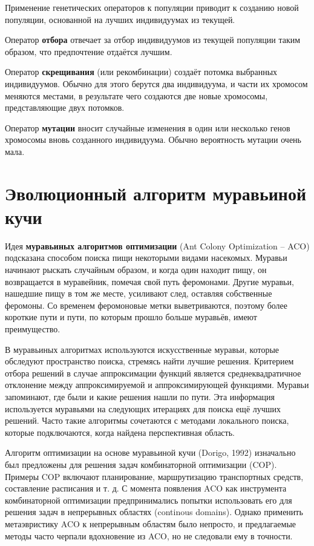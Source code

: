 Применение генетических операторов к популяции приводит к созданию новой популяции, основанной на лучших индивидуумах из текущей.~\cite{book1}

Оператор \textbf{отбора} отвечает за отбор индивидуумов из текущей популяции таким образом, что предпочтение отдаётся лучшим.~\cite{book1}

Оператор \textbf{скрещивания} (или рекомбинации) создаёт потомка выбранных индивидуумов. Обычно для этого берутся два индивидуума, и части их хромосом меняются местами, в результате чего создаются две новые хромосомы, представляющие двух потомков.~\cite{book1}

Оператор \textbf{мутации} вносит случайные изменения в один или несколько генов хромосомы вновь созданного индивидуума. Обычно вероятность мутации очень мала.~\cite{book1}

\section{Эволюционный алгоритм муравьиной кучи}

Идея \textbf{муравьиных алгоритмов оптимизации} (Ant Colony Optimization – ACO) подсказана способом поиска пищи некоторыми видами насекомых. Муравьи начинают рыскать случайным образом, и когда один находит пищу, он возвращается в муравейник, помечая свой путь феромонами. Другие муравьи, нашедшие пищу в том же месте, усиливают след, оставляя собственные феромоны. Со временем феромоновые метки выветриваются, поэтому более короткие пути и пути, по которым прошло больше муравьёв, имеют преимущество.~\cite{book1}

В муравьиных алгоритмах используются искусственные муравьи, которые обследуют пространство поиска, стремясь найти лучшие решения. Критерием отбора решений в случае аппроксимации функций является среднеквадратичное отклонение между аппроксимируемой и
аппроксимирующей функциями. Муравьи запоминают, где были и какие решения нашли по пути. Эта информация используется муравьями на следующих итерациях для поиска ещё лучших решений. Часто такие алгоритмы сочетаются с методами локального поиска, которые подключаются, когда найдена перспективная область.~\cite{book1}

Алгоритм оптимизации на основе муравьиной кучи (Dorigo, 1992) изначально был предложены для решения задач комбинаторной оптимизации (COP). Примеры COP включают планирование, маршрутизацию транспортных средств, составление расписания и т. д. С момента появления ACO как инструмента комбинаторной оптимизации предпринимались попытки использовать его для решения задач в непрерывных областях (continous domains). Однако применить метаэвристику ACO к непрерывным областям было непросто, и предлагаемые методы часто черпали вдохновение из ACO, но не следовали ему в точности.~\cite{book2}~\cite{article1}

